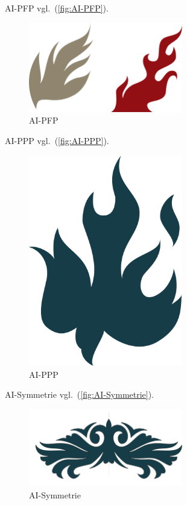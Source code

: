 AI-PFP vgl.~(\autoref{fig:AI-PFP}).

\begin{figure}[!hb]%
\centering
\includegraphics[width=0.6\textwidth]{Grafiken/AI-PFP.pdf}
\caption{AI-PFP}
\label{fig:AI-PFP}%
\end{figure}

AI-PPP vgl.~(\autoref{fig:AI-PPP}).

\begin{figure}[!hb]%
\centering
\includegraphics[width=0.6\textwidth]{Grafiken/AI-PPP.pdf}
\caption{AI-PPP}
\label{fig:AI-PPP}%
\end{figure}

AI-Symmetrie vgl.~(\autoref{fig:AI-Symmetrie}).

\begin{figure}[!hb]%
\centering
\includegraphics[width=0.6\textwidth]{Grafiken/AI-Symmetrie.pdf}
\caption{AI-Symmetrie}
\label{fig:AI-Symmetrie}%
\end{figure}

